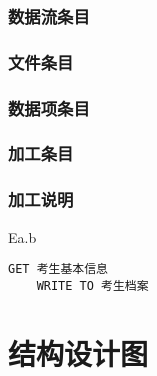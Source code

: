 \documentclass[CJK,utf8]{ctexrep}
\begin{document}
\subsubsection*{数据流条目}

\subsubsection*{文件条目}

\subsubsection*{数据项条目}

\subsubsection*{加工条目}

\subsubsection*{加工说明}

Ea.b
\begin{lstlisting}[style=proc]
	GET 考生基本信息
	WRITE TO 考生档案
\end{lstlisting}

\section*{结构设计图}
\end{document}
